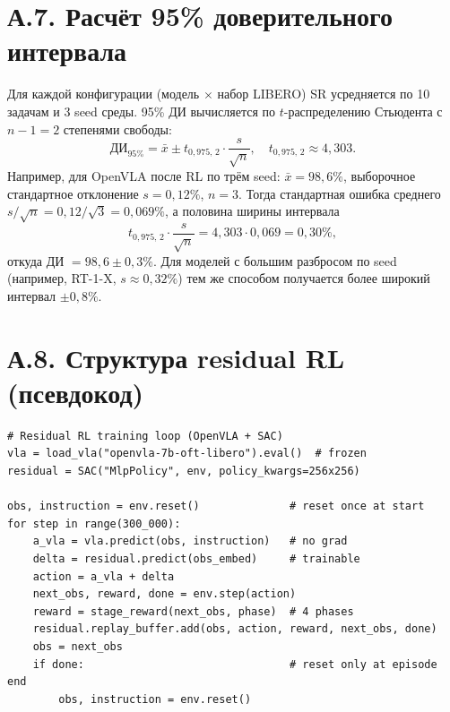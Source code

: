 \section*{А.7. Расчёт 95\% доверительного интервала}

    Для каждой конфигурации (модель $\times$ набор LIBERO) SR усредняется по 10 задачам и 3 seed среды. 95\% ДИ вычисляется по $t$-распределению Стьюдента с $n-1 = 2$ степенями свободы:
\begin{equation*}
    \text{ДИ}_{95\%} = \bar{x} \pm t_{0{,}975,\,2} \cdot \frac{s}{\sqrt{n}}, \quad t_{0{,}975,\,2} \approx 4{,}303.
\end{equation*}
    Например, для OpenVLA после RL по трём seed: $\bar{x} = 98{,}6\%$, выборочное стандартное отклонение $s = 0{,}12\%$, $n = 3$. Тогда стандартная ошибка среднего $s/\sqrt{n} = 0{,}12/\sqrt{3} = 0{,}069\%$, а половина ширины интервала
\begin{equation*}
    t_{0{,}975,\,2}\cdot \frac{s}{\sqrt{n}} = 4{,}303 \cdot 0{,}069 = 0{,}30\%,
\end{equation*}
    откуда ДИ $= 98{,}6 \pm 0{,}3\%$. Для моделей с большим разбросом по seed (например, RT-1-X, $s \approx 0{,}32\%$) тем же способом получается более широкий интервал $\pm 0{,}8\%$.

\section*{А.8. Структура residual RL (псевдокод)}

{\footnotesize
\begin{verbatim}
# Residual RL training loop (OpenVLA + SAC)
vla = load_vla("openvla-7b-oft-libero").eval()  # frozen
residual = SAC("MlpPolicy", env, policy_kwargs=256x256)

obs, instruction = env.reset()              # reset once at start
for step in range(300_000):
    a_vla = vla.predict(obs, instruction)   # no grad
    delta = residual.predict(obs_embed)     # trainable
    action = a_vla + delta
    next_obs, reward, done = env.step(action)
    reward = stage_reward(next_obs, phase)  # 4 phases
    residual.replay_buffer.add(obs, action, reward, next_obs, done)
    obs = next_obs
    if done:                                # reset only at episode end
        obs, instruction = env.reset()
\end{verbatim}
}

\endinput
